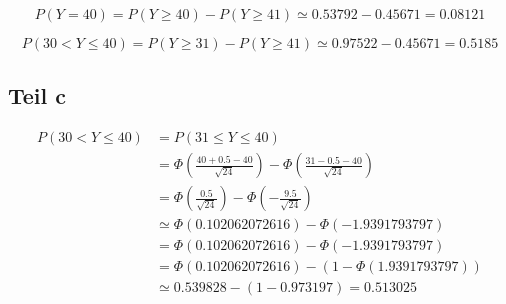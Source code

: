 \documentclass[10pt,a4paper]{article}
\begin{document}
\begin{equation}
  P(Y = 40) = P(Y \ge 40) - P(Y \ge 41) \simeq 0.53792 - 0.45671 = 0.08121
\end{equation}

\begin{equation}
  P(30 < Y \le 40) = P(Y \ge 31) - P(Y \ge 41) \simeq 0.97522 - 0.45671 = 0.5185
\end{equation}

\subsection{Teil c}

\begin{align*}
  P(30 < Y \le 40) & = P(31 \le Y \le 40)\\
  & = \Phi\left( \frac{40 + 0.5 - 40}{\sqrt{24}} \right) - \Phi\left( \frac{31 - 0.5 - 40}{\sqrt{24}} \right)\\
  & = \Phi\left( \frac{0.5}{\sqrt{24}} \right) - \Phi\left( -\frac{9.5}{\sqrt{24}} \right)\\
  & \simeq \Phi(0.102062072616) - \Phi(-1.9391793797)\\
  & = \Phi(0.102062072616) - \Phi(-1.9391793797)\\
  & = \Phi(0.102062072616) - (1 - \Phi(1.9391793797))\\
  & \simeq 0.539828 - (1 - 0.973197) = 0.513025
\end{align*}
\end{document}

